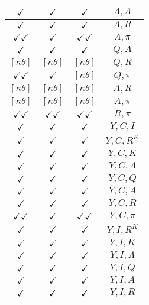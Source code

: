\documentclass[a4paper,10pt]{article}
\begin{document}
\begin{longtable}{|c|c|c|c|}
\hline
$\checkmark$ & $\checkmark$ & $\checkmark$ & ${\Lambda},{A}$ \\
\hline
$\checkmark$ & $\checkmark$ & $\checkmark$ & ${\Lambda},{R}$ \\
\hline
$\checkmark\checkmark$ & $\checkmark$ & $\checkmark\checkmark$ & ${\Lambda},{\pi}$ \\
\hline
$\checkmark$ & $\checkmark$ & $\checkmark$ & ${Q},{A}$ \\
\hline
$[\kappa \theta ]$ & $[\kappa \theta ]$ & $[\kappa \theta ]$ & ${Q},{R}$ \\
\hline
$\checkmark\checkmark$ & $\checkmark$ & $[\kappa \theta ]$ & ${Q},{\pi}$ \\
\hline
$[\kappa \theta ]$ & $[\kappa \theta ]$ & $[\kappa \theta ]$ & ${A},{R}$ \\
\hline
$[\kappa \theta ]$ & $[\kappa \theta ]$ & $[\kappa \theta ]$ & ${A},{\pi}$ \\
\hline
$\checkmark\checkmark$ & $\checkmark\checkmark$ & $\checkmark\checkmark$ & ${R},{\pi}$ \\
\hline
$\checkmark$ & $\checkmark$ & $\checkmark$ & ${Y},{C},{I}$ \\
\hline
$\checkmark$ & $\checkmark$ & $\checkmark$ & ${Y},{C},{R^{K}}$ \\
\hline
$\checkmark$ & $\checkmark$ & $\checkmark$ & ${Y},{C},{K}$ \\
\hline
$\checkmark$ & $\checkmark$ & $\checkmark$ & ${Y},{C},{\Lambda}$ \\
\hline
$\checkmark$ & $\checkmark$ & $\checkmark$ & ${Y},{C},{Q}$ \\
\hline
$\checkmark$ & $\checkmark$ & $\checkmark$ & ${Y},{C},{A}$ \\
\hline
$\checkmark$ & $\checkmark$ & $\checkmark$ & ${Y},{C},{R}$ \\
\hline
$\checkmark\checkmark$ & $\checkmark$ & $\checkmark\checkmark$ & ${Y},{C},{\pi}$ \\
\hline
$\checkmark$ & $\checkmark$ & $\checkmark$ & ${Y},{I},{R^{K}}$ \\
\hline
$\checkmark$ & $\checkmark$ & $\checkmark$ & ${Y},{I},{K}$ \\
\hline
$\checkmark$ & $\checkmark$ & $\checkmark$ & ${Y},{I},{\Lambda}$ \\
\hline
$\checkmark$ & $\checkmark$ & $\checkmark$ & ${Y},{I},{Q}$ \\
\hline
$\checkmark$ & $\checkmark$ & $\checkmark$ & ${Y},{I},{A}$ \\
\hline
$\checkmark$ & $\checkmark$ & $\checkmark$ & ${Y},{I},{R}$ \\

\end{longtable}
\end{document}
